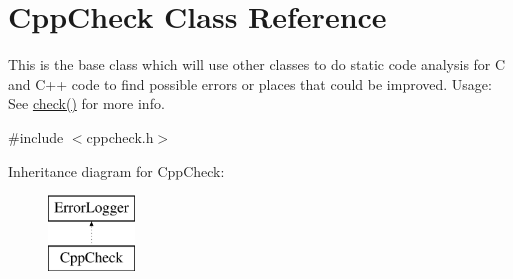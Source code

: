 \hypertarget{class_cpp_check}{\section{Cpp\-Check Class Reference}
\label{class_cpp_check}
}


This is the base class which will use other classes to do static code analysis for C and C++ code to find possible errors or places that could be improved. Usage\-: See \hyperlink{class_cpp_check_abc81dee40c7f0c5f5ef353c2e4e46729}{check()} for more info.  




{\ttfamily \#include $<$cppcheck.\-h$>$}

Inheritance diagram for Cpp\-Check\-:\begin{figure}[H]
\begin{center}
\leavevmode
\includegraphics[height=2.000000cm]{class_cpp_check}
\end{center}
\end{figure}
